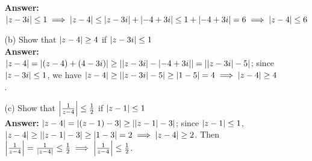 \documentclass{article}
\begin{document}
\begin{itemize}
\begin{itemize}
                    \textbf{Answer: } $\abs{z-3i}\leq 1\implies\abs{z-4}\leq\abs{z-3i}+\abs{-4+3i}\leq 1+\abs{-4+3i}=6\implies\abs{z-4}\leq 6$
              \item [(b)] Show that $\abs{z-4}\geq 4$ if $\abs{z-3i}\leq 1$\\
                    \textbf{Answer: } $\abs{z-4}=\abs{(z-4)+(4-3i)}\geq\abs{\abs{z-3i}-\abs{-4+3i}}=\abs{\abs{z-3i}-5}$; since $\abs{z-3i}\leq 1$, we have $\abs{z-4}\geq\abs{\abs{z-3i}-5}\geq\abs{1-5}=4\implies\abs{z-4}\geq 4$.
              \item [(c)] Show that $\abs{\frac{1}{z-4}}\leq\frac{1}{2}$ if $\abs{z-1}\leq 1$\\
                    \textbf{Answer: } $\abs{z-4}=\abs{(z-1)-3}\geq\abs{\abs{z-1}-3}$; since $\abs{z-1}\leq 1$, $\abs{z-4}\geq\abs{\abs{z-1}-3}\geq\abs{1-3}=2\implies\abs{z-4}\geq 2$. Then $\abs{\frac{1}{z-4}}=\frac{1}{\abs{z-4}}\leq\frac{1}{2}\implies\abs{\frac{1}{z-4}}\leq\frac{1}{2}$.
          \end{itemize}
\end{itemize}
\end{document}
